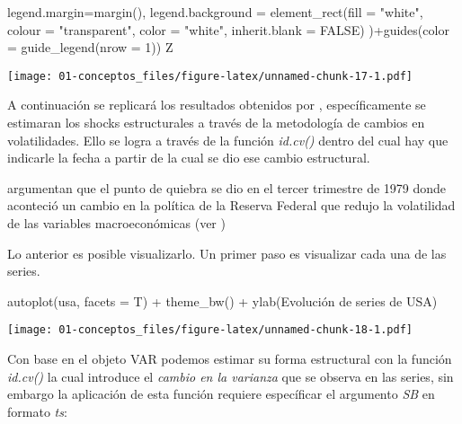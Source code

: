 \documentclass[
]{book}
\newenvironment{Shaded}{\begin{snugshade}}{\end{snugshade}}
\newcommand{\AttributeTok}[1]{\textcolor[rgb]{0.77,0.63,0.00}{#1}}
\newcommand{\ConstantTok}[1]{\textcolor[rgb]{0.00,0.00,0.00}{#1}}
\newcommand{\DecValTok}[1]{\textcolor[rgb]{0.00,0.00,0.81}{#1}}
\newcommand{\FunctionTok}[1]{\textcolor[rgb]{0.00,0.00,0.00}{#1}}
\newcommand{\NormalTok}[1]{#1}
\newcommand{\SpecialCharTok}[1]{\textcolor[rgb]{0.00,0.00,0.00}{#1}}
\newcommand{\StringTok}[1]{\textcolor[rgb]{0.31,0.60,0.02}{#1}}
\begin{document}
\begin{Shaded}
\begin{Highlighting}[]
  \AttributeTok{legend.margin=}\FunctionTok{margin}\NormalTok{(),}
  \AttributeTok{legend.background =} \FunctionTok{element\_rect}\NormalTok{(}\AttributeTok{fill =} \StringTok{"white"}\NormalTok{, }\AttributeTok{colour =} \StringTok{"transparent"}\NormalTok{,}
                                   \AttributeTok{color =} \StringTok{"white"}\NormalTok{, }\AttributeTok{inherit.blank =} \ConstantTok{FALSE}\NormalTok{)}
\NormalTok{)}\SpecialCharTok{+}\FunctionTok{guides}\NormalTok{(}\AttributeTok{color =} \FunctionTok{guide\_legend}\NormalTok{(}\AttributeTok{nrow =} \DecValTok{1}\NormalTok{))}
\NormalTok{Z}
\end{Highlighting}
\end{Shaded}

\texttt{[image: 01-conceptos\_files/figure-latex/unnamed-chunk-17-1.pdf]}

A continuación se replicará los resultados obtenidos por \citet{Herwartz2016}, específicamente se estimaran los shocks estructurales a través de la metodología de cambios en volatilidades. Ello se logra a través de la función \emph{id.cv()} dentro del cual hay que indicarle la fecha a partir de la cual se dio ese cambio estructural.

\citet{Herwartz2016} argumentan que el punto de quiebra se dio en el tercer trimestre de 1979 donde aconteció un cambio en la política de la Reserva Federal que redujo la volatilidad de las variables macroeconómicas (ver \citet{Stock2003})

Lo anterior es posible visualizarlo.
Un primer paso es visualizar cada una de las series.

\begin{Shaded}
\begin{Highlighting}[]
\FunctionTok{autoplot}\NormalTok{(usa, }\AttributeTok{facets =}\NormalTok{ T) }\SpecialCharTok{+} \FunctionTok{theme\_bw}\NormalTok{() }\SpecialCharTok{+} \FunctionTok{ylab}\NormalTok{(}\StringTok{\textquotesingle{}Evolución de series de USA\textquotesingle{}}\NormalTok{)}
\end{Highlighting}
\end{Shaded}

\texttt{[image: 01-conceptos\_files/figure-latex/unnamed-chunk-18-1.pdf]}

Con base en el objeto VAR podemos estimar su forma estructural con la función \emph{id.cv()} la cual introduce el \emph{cambio en la varianza} que se observa en las series, sin embargo la aplicación de esta función requiere específicar el argumento \emph{SB} en formato \emph{ts}:
\end{document}
